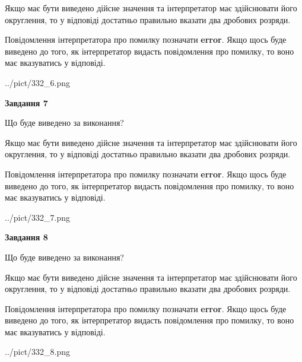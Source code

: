 \documentclass[12pt, ukrainian]{article}
\begin{document}
{\begin {Large}
Якщо має бути виведено дійсне значення та інтерпретатор має здійснювати його округлення, 
то у відповіді достатньо правильно вказати два дробових розряди.

Повідомлення інтерпретатора про помилку позначати \textbf{error}.
Якщо щось буде виведено до того, як інтерпретатор видасть повідомлення про помилку, 
то воно має вказуватись у відповіді. \par

\begin{center}
	{../pict/332_6.png}
\end{center}
\newpage

{\begin {center}\textbf{Завдання 7}\end {center}}\par
Що буде виведено за виконання? \par

Якщо має бути виведено дійсне значення та інтерпретатор має здійснювати його округлення, 
то у відповіді достатньо правильно вказати два дробових розряди.

Повідомлення інтерпретатора про помилку позначати \textbf{error}.
Якщо щось буде виведено до того, як інтерпретатор видасть повідомлення про помилку, 
то воно має вказуватись у відповіді. \par

\begin{center}
	{../pict/332_7.png}
\end{center}
\newpage

{\begin {center}\textbf{Завдання 8}\end {center}}\par
Що буде виведено за виконання? \par

Якщо має бути виведено дійсне значення та інтерпретатор має здійснювати його округлення, 
то у відповіді достатньо правильно вказати два дробових розряди.

Повідомлення інтерпретатора про помилку позначати \textbf{error}.
Якщо щось буде виведено до того, як інтерпретатор видасть повідомлення про помилку, 
то воно має вказуватись у відповіді. \par

\begin{center}
	{../pict/332_8.png}
\end{center}
\newpage


\end{Large}}
\end{document}
